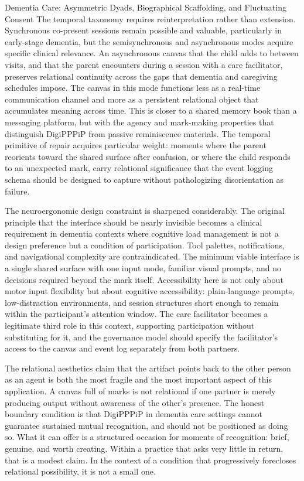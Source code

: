 \documentclass[
  ignorenonframetext,
]{beamer}
\begin{document}
\begin{frame}[allowframebreaks]{Dementia Care: Asymmetric Dyads,
Biographical Scaffolding, and Fluctuating Consent}
The temporal taxonomy requires reinterpretation rather than extension.
Synchronous co-present sessions remain possible and valuable,
particularly in early-stage dementia, but the semisynchronous and
asynchronous modes acquire specific clinical relevance. An asynchronous
canvas that the child adds to between visits, and that the parent
encounters during a session with a care facilitator, preserves
relational continuity across the gaps that dementia and caregiving
schedules impose. The canvas in this mode functions less as a real-time
communication channel and more as a persistent relational object that
accumulates meaning across time. This is closer to a shared memory book
than a messaging platform, but with the agency and mark-making
properties that distinguish DigiPPPiP from passive reminiscence
materials. The temporal primitive of repair acquires particular weight:
moments where the parent reorients toward the shared surface after
confusion, or where the child responds to an unexpected mark, carry
relational significance that the event logging schema should be designed
to capture without pathologizing disorientation as failure.

The neuroergonomic design constraint is sharpened considerably. The
original principle that the interface should be nearly invisible becomes
a clinical requirement in dementia contexts where cognitive load
management is not a design preference but a condition of participation.
Tool palettes, notifications, and navigational complexity are
contraindicated. The minimum viable interface is a single shared surface
with one input mode, familiar visual prompts, and no decisions required
beyond the mark itself. Accessibility here is not only about motor input
flexibility but about cognitive accessibility: plain-language prompts,
low-distraction environments, and session structures short enough to
remain within the participant's attention window. The care facilitator
becomes a legitimate third role in this context, supporting
participation without substituting for it, and the governance model
should specify the facilitator's access to the canvas and event log
separately from both partners.

The relational aesthetics claim that the artifact points back to the
other person as an agent is both the most fragile and the most important
aspect of this application. A canvas full of marks is not relational if
one partner is merely producing output without awareness of the other's
presence. The honest boundary condition is that DigiPPPiP in dementia
care settings cannot guarantee sustained mutual recognition, and should
not be positioned as doing so. What it can offer is a structured
occasion for moments of recognition: brief, genuine, and worth creating.
Within a practice that asks very little in return, that is a modest
claim. In the context of a condition that progressively forecloses
relational possibility, it is not a small one.
\end{frame}
\end{document}
